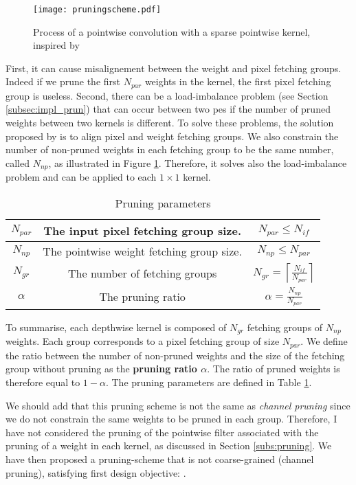 \begin{figure}
    \centering
    \texttt{[image: pruningscheme.pdf]}
    \caption{Process of a pointwise convolution with a sparse pointwise kernel, inspired by \cite{kang_accelerator-aware_2020}}
    \label{fig:prunedwg}
\end{figure}
%
First, it can cause misalignement between the weight and pixel fetching groups. Indeed if we prune the first $N_{par}$ weights in the kernel, the first pixel fetching group is useless. Second, there can be a load-imbalance problem (see Section \ref{subsec:impl_prun}) that can occur between two \acrshort{pe}s if the number of pruned weights between two kernels is different. To solve these problems, the solution proposed by \cite{kang_accelerator-aware_2020} is to align pixel and weight fetching groups. We also constrain the number of non-pruned weights in each fetching group to be the same number, called $N_{np}$, as illustrated in Figure \ref{fig:prunedwg}. Therefore, it solves also the load-imbalance problem and can be applied to each $1 \times 1$ kernel.

%
\begin{table}
    \center
    \begin{tabular}{|c|c|c|}
        \hline
        $N_{par}$ & The input pixel fetching group size. & $N_{par} \leq N_{if}$ \\
        \hline
        $N_{np}$  & The pointwise weight fetching group size. & $N_{np} \leq N_{par}$ \\
        \hline
        $N_{gr}$  & The number of fetching groups & $N_{gr} = \left\lceil \frac{N_{if}}{N_{par}} \right\rceil $ \\
        \hline
        $\alpha$  & The pruning ratio & $\alpha = \frac{N_{np}}{N_{par}}  $ \\
        \hline
    \end{tabular}
    \caption{Pruning parameters}
    \label{tab:pr_param}
\end{table}
%
To summarise, each depthwise kernel is composed of $N_{gr}$ fetching groups of $N_{np}$ weights. Each group corresponds to a pixel fetching group of size $N_{par}$. We define the ratio between the number of non-pruned weights and the size of the fetching group without pruning as the \textbf{pruning ratio $\alpha$}. The ratio of pruned weights is therefore equal to $1 - \alpha$. The pruning parameters are defined in Table \ref{tab:pr_param}.

We should add that this pruning scheme is not the same as \textit{channel pruning} since we do not constrain the same weights to be pruned in each group. Therefore, I have not considered the pruning of the pointwise filter associated with the pruning of a weight in each kernel, as discussed in Section \ref{subs:pruning}. We have then proposed a pruning-scheme that is not coarse-grained (channel pruning), satisfying first design objective: \textbf{}.
%
